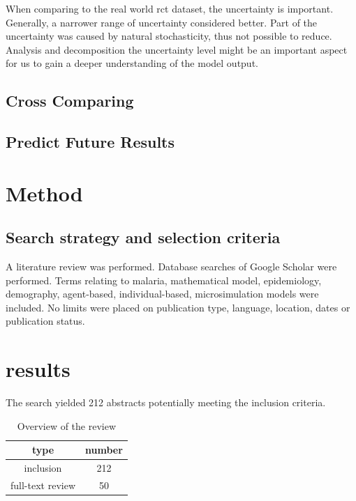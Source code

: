 \documentclass[a4paper, 12pt, twoside]{article}
\begin{document}
When comparing to the real world \gls{rct} dataset, the uncertainty is important.
Generally, a narrower range of uncertainty considered better.
Part of the uncertainty was caused by natural stochasticity, thus not possible to reduce.
Analysis and decomposition the uncertainty level might be an important aspect for us to gain a deeper understanding of the model output.

\subsection{Cross Comparing}

\subsection{Predict Future Results}

\section{Method}%
\label{sec:method}
\subsection{Search strategy and selection criteria}
A literature review was performed.
Database searches of Google Scholar were performed.
Terms relating to malaria, mathematical model, epidemiology, demography, agent-based, individual-based, microsimulation models were included. No limits were placed on publication type, language, location, dates or publication status.

\section{results}%
\label{sec:results}
The search yielded 212 abstracts potentially meeting the inclusion criteria.

\begin{table}
	\centering
	\label{tab:overview_of_the_review}
	\begin{tabular}{c S}
		\toprule
		type             & {number} \\
		\midrule
		inclusion        & 212      \\
		full-text review & 50       \\
		\bottomrule
	\end{tabular}
	\caption{Overview of the review}
\end{table}

\appendix
\printglossaries
\printnomenclature


\end{document}
